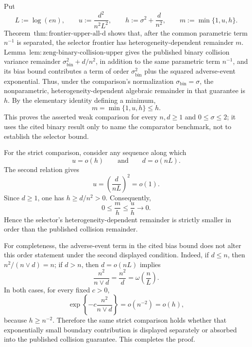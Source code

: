 Put
\[
 L:=\log(en),\qquad
 u:=\frac{d^2}{n^2L^2},\qquad
 h:=\sigma^2+\frac d{n^2},
 \qquad m:=\min\{1,u,h\}.
\]
Theorem~\(\mathrm{thm:frontier\text{-}upper\text{-}all\text{-}d}\) shows that, after the common parametric term \(n^{-1}\) is separated, the selector frontier has heterogeneity-dependent remainder \(m\).  Lemma~\(\mathrm{lem:zeng\text{-}binary\text{-}collision\text{-}upper}\) gives the published binary collision variance remainder \(\sigma_{\mathrm{bin}}^2+d/n^2\), in addition to the same parametric term \(n^{-1}\), and its bias bound contributes a term of order \(\sigma_{\mathrm{bin}}^2\) plus the squared adverse-event exponential.  Thus, under the comparison's normalization \(\sigma_{\mathrm{bin}}=\sigma\), the nonparametric, heterogeneity-dependent algebraic remainder in that guarantee is \(h\).  By the elementary identity defining a minimum,
\[
 m=\min\{1,u,h\}\le h.
\]
This proves the asserted weak comparison for every \(n,d\ge1\) and \(0\le\sigma\le2\); it uses the cited binary result only to name the comparator benchmark, not to establish the selector bound.

For the strict comparison, consider any sequence along which
\[
 u=o(h)
 \qquad\text{and}\qquad
 d=o(nL).
\]
The second relation gives
\[
 u=\left(\frac d{nL}\right)^2=o(1).
\]
Since \(d\ge1\), one has \(h\ge d/n^2>0\).  Consequently,
\[
 0\le \frac{m}{h}
 \le \frac{u}{h}
 \longrightarrow0.
\]
Hence the selector's heterogeneity-dependent remainder is strictly smaller in order than the published collision remainder.

For completeness, the adverse-event term in the cited bias bound does not alter this order statement under the second displayed condition.  Indeed, if \(d\le n\), then \(n^2/(n\vee d)=n\); if \(d>n\), then \(d=o(nL)\) implies
\[
 \frac{n^2}{n\vee d}=\frac{n^2}{d}=\omega\!\left(\frac nL\right).
\]
In both cases, for every fixed \(c>0\),
\[
 \exp\!\left\{-c\frac{n^2}{n\vee d}\right\}=o(n^{-2})=o(h),
\]
because \(h\ge n^{-2}\).  Therefore the same strict comparison holds whether that exponentially small boundary contribution is displayed separately or absorbed into the published collision guarantee.  This completes the proof.